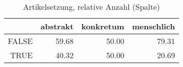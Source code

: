 \begin{table}[ht]
\centering
\begin{tabular}{rrrr}
  \hline
 & abstrakt & konkretum & menschlich \\ 
  \hline
FALSE & 59.68 & 50.00 & 79.31 \\ 
  TRUE & 40.32 & 50.00 & 20.69 \\ 
   \hline
\end{tabular}
\caption{Artikelsetzung, relative Anzahl (Spalte)} 
\end{table}
